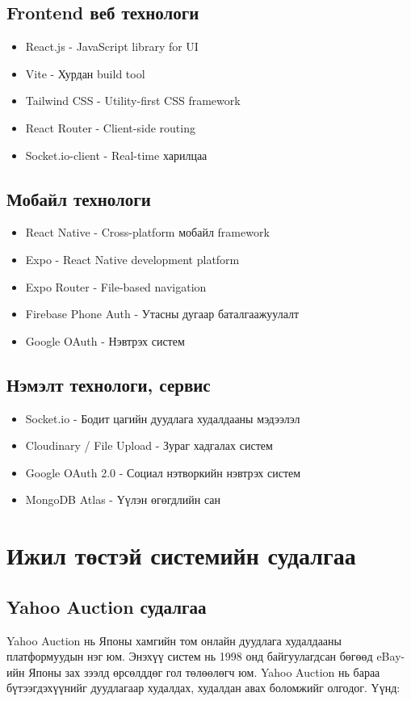 \subsection{Frontend веб технологи}
\begin{itemize}
\item React.js - JavaScript library for UI
\item Vite - Хурдан build tool
\item Tailwind CSS - Utility-first CSS framework
\item React Router - Client-side routing
\item Socket.io-client - Real-time харилцаа
\end{itemize}

\subsection{Мобайл технологи}
\begin{itemize}
\item React Native - Cross-platform мобайл framework
\item Expo - React Native development platform
\item Expo Router - File-based navigation
\item Firebase Phone Auth - Утасны дугаар баталгаажуулалт
\item Google OAuth - Нэвтрэх систем
\end{itemize}

\subsection{Нэмэлт технологи, сервис}
\begin{itemize}
\item Socket.io - Бодит цагийн дуудлага худалдааны мэдээлэл
\item Cloudinary / File Upload - Зураг хадгалах систем
\item Google OAuth 2.0 - Социал нэтворкийн нэвтрэх систем
\item MongoDB Atlas - Үүлэн өгөгдлийн сан
\end{itemize}

\section{Ижил төстэй системийн судалгаа}
\subsection{Yahoo Auction судалгаа}
Yahoo Auction нь Японы хамгийн том онлайн дуудлага худалдааны платформуудын нэг юм. Энэхүү систем нь 1998 онд байгуулагдсан бөгөөд eBay-ийн Японы зах зээлд өрсөлддөг гол төлөөлөгч юм. Yahoo Auction нь бараа бүтээгдэхүүнийг дуудлагаар худалдах, худалдан авах боломжийг олгодог. Үүнд:


